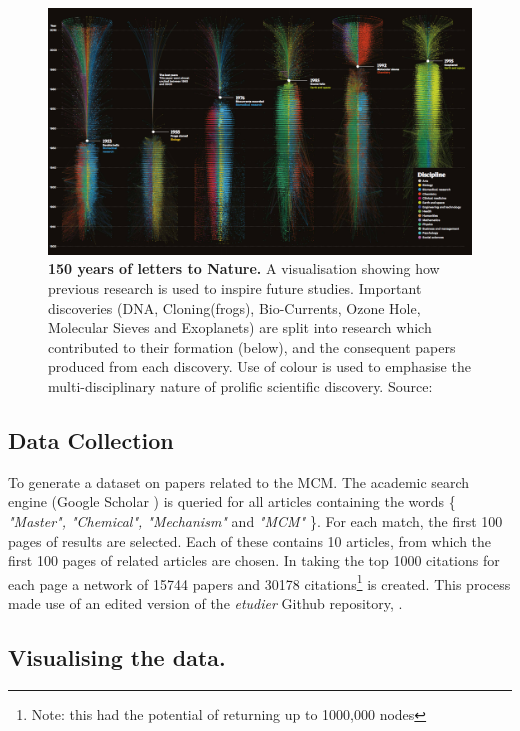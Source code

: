 \begin{figure}[H]
     \centering
         \includegraphics[width=0.92\textheight,angle=90]{figures_c3/naturegraph.png}

        \caption{\textbf{150 years of letters to Nature.} A visualisation showing how previous research is used to inspire future studies. Important discoveries (DNA, Cloning(frogs), Bio-Currents, Ozone Hole, Molecular Sieves and Exoplanets) are split into research which contributed to their formation (below), and the consequent papers produced from each discovery. Use of colour is used to emphasise the multi-disciplinary nature of prolific scientific discovery. Source: \citep{naturecover}}
        \label{fig:naturecover}
\end{figure}



\subsection{Data Collection}\label{sec:scholar}

To generate a dataset on papers related to the MCM. The academic search engine (Google Scholar \citep{scholar}) is queried for all articles containing the words \{ \emph{"Master", "Chemical", "Mechanism"} and \emph{"MCM"} \}. For each match, the first 100 pages of results are selected. Each of these contains 10 articles, from which the first 100 pages of related articles are chosen.
In taking the top 1000 citations for each page a network of 15744 papers and 30178 citations\footnote{Note: this had the potential of returning up to 1000,000 nodes} is created. This process made use of an edited version of the  \emph{etudier} Github repository, \citep{web}.


\subsection{Visualising the data.}

